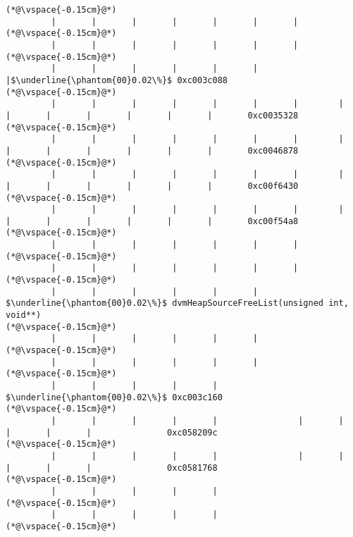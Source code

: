\begin{lstlisting}[caption=NewDirectByteBuffer, label=profile:C2JNewDirectBuffer-512, numberbychapter=true, frame=lines, float, floatplacement=t]
(*@\vspace{-0.15cm}@*)
         |       |       |       |       |       |       |
(*@\vspace{-0.15cm}@*)
         |       |       |       |       |       |       |
(*@\vspace{-0.15cm}@*)
         |       |       |       |       |       |       |$\underline{\phantom{00}0.02\%}$ 0xc003c088
(*@\vspace{-0.15cm}@*)
         |       |       |       |       |       |       |        |       |       |       |       |       |       |       0xc0035328
(*@\vspace{-0.15cm}@*)
         |       |       |       |       |       |       |        |       |       |       |       |       |       |       0xc0046878
(*@\vspace{-0.15cm}@*)
         |       |       |       |       |       |       |        |       |       |       |       |       |       |       0xc00f6430
(*@\vspace{-0.15cm}@*)
         |       |       |       |       |       |       |        |       |       |       |       |       |       |       0xc00f54a8
(*@\vspace{-0.15cm}@*)
         |       |       |       |       |       |       |
(*@\vspace{-0.15cm}@*)
         |       |       |       |       |       |       |
(*@\vspace{-0.15cm}@*)
         |       |       |       |       |       |        $\underline{\phantom{00}0.02\%}$ dvmHeapSourceFreeList(unsigned int, void**)
(*@\vspace{-0.15cm}@*)
         |       |       |       |       |       |
(*@\vspace{-0.15cm}@*)
         |       |       |       |       |       |
(*@\vspace{-0.15cm}@*)
         |       |       |       |       |        $\underline{\phantom{00}0.02\%}$ 0xc003c160
(*@\vspace{-0.15cm}@*)
         |       |       |       |       |                |       |       |       |       |               0xc058209c
(*@\vspace{-0.15cm}@*)
         |       |       |       |       |                |       |       |       |       |               0xc0581768
(*@\vspace{-0.15cm}@*)
         |       |       |       |       |
(*@\vspace{-0.15cm}@*)
         |       |       |       |       |
(*@\vspace{-0.15cm}@*)

\end{lstlisting}

